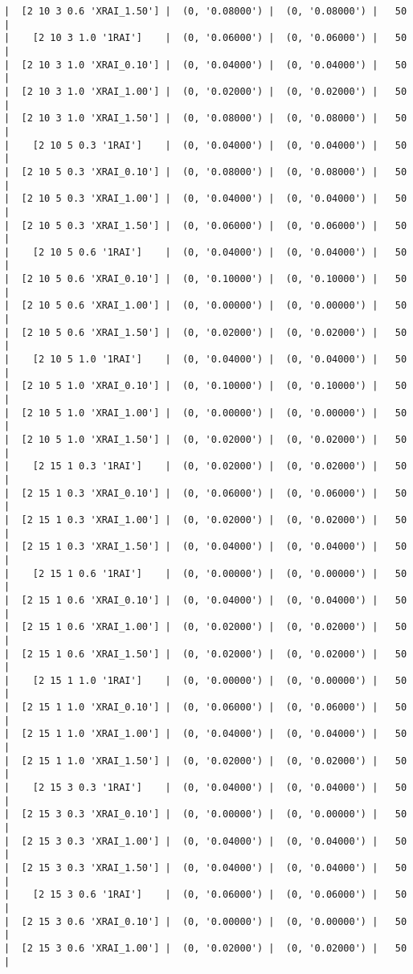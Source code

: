 \documentclass{article}
\begin{document}
\begin{verbatim}
|  [2 10 3 0.6 'XRAI_1.50'] |  (0, '0.08000') |  (0, '0.08000') |   50  |
|    [2 10 3 1.0 '1RAI']    |  (0, '0.06000') |  (0, '0.06000') |   50  |
|  [2 10 3 1.0 'XRAI_0.10'] |  (0, '0.04000') |  (0, '0.04000') |   50  |
|  [2 10 3 1.0 'XRAI_1.00'] |  (0, '0.02000') |  (0, '0.02000') |   50  |
|  [2 10 3 1.0 'XRAI_1.50'] |  (0, '0.08000') |  (0, '0.08000') |   50  |
|    [2 10 5 0.3 '1RAI']    |  (0, '0.04000') |  (0, '0.04000') |   50  |
|  [2 10 5 0.3 'XRAI_0.10'] |  (0, '0.08000') |  (0, '0.08000') |   50  |
|  [2 10 5 0.3 'XRAI_1.00'] |  (0, '0.04000') |  (0, '0.04000') |   50  |
|  [2 10 5 0.3 'XRAI_1.50'] |  (0, '0.06000') |  (0, '0.06000') |   50  |
|    [2 10 5 0.6 '1RAI']    |  (0, '0.04000') |  (0, '0.04000') |   50  |
|  [2 10 5 0.6 'XRAI_0.10'] |  (0, '0.10000') |  (0, '0.10000') |   50  |
|  [2 10 5 0.6 'XRAI_1.00'] |  (0, '0.00000') |  (0, '0.00000') |   50  |
|  [2 10 5 0.6 'XRAI_1.50'] |  (0, '0.02000') |  (0, '0.02000') |   50  |
|    [2 10 5 1.0 '1RAI']    |  (0, '0.04000') |  (0, '0.04000') |   50  |
|  [2 10 5 1.0 'XRAI_0.10'] |  (0, '0.10000') |  (0, '0.10000') |   50  |
|  [2 10 5 1.0 'XRAI_1.00'] |  (0, '0.00000') |  (0, '0.00000') |   50  |
|  [2 10 5 1.0 'XRAI_1.50'] |  (0, '0.02000') |  (0, '0.02000') |   50  |
|    [2 15 1 0.3 '1RAI']    |  (0, '0.02000') |  (0, '0.02000') |   50  |
|  [2 15 1 0.3 'XRAI_0.10'] |  (0, '0.06000') |  (0, '0.06000') |   50  |
|  [2 15 1 0.3 'XRAI_1.00'] |  (0, '0.02000') |  (0, '0.02000') |   50  |
|  [2 15 1 0.3 'XRAI_1.50'] |  (0, '0.04000') |  (0, '0.04000') |   50  |
|    [2 15 1 0.6 '1RAI']    |  (0, '0.00000') |  (0, '0.00000') |   50  |
|  [2 15 1 0.6 'XRAI_0.10'] |  (0, '0.04000') |  (0, '0.04000') |   50  |
|  [2 15 1 0.6 'XRAI_1.00'] |  (0, '0.02000') |  (0, '0.02000') |   50  |
|  [2 15 1 0.6 'XRAI_1.50'] |  (0, '0.02000') |  (0, '0.02000') |   50  |
|    [2 15 1 1.0 '1RAI']    |  (0, '0.00000') |  (0, '0.00000') |   50  |
|  [2 15 1 1.0 'XRAI_0.10'] |  (0, '0.06000') |  (0, '0.06000') |   50  |
|  [2 15 1 1.0 'XRAI_1.00'] |  (0, '0.04000') |  (0, '0.04000') |   50  |
|  [2 15 1 1.0 'XRAI_1.50'] |  (0, '0.02000') |  (0, '0.02000') |   50  |
|    [2 15 3 0.3 '1RAI']    |  (0, '0.04000') |  (0, '0.04000') |   50  |
|  [2 15 3 0.3 'XRAI_0.10'] |  (0, '0.00000') |  (0, '0.00000') |   50  |
|  [2 15 3 0.3 'XRAI_1.00'] |  (0, '0.04000') |  (0, '0.04000') |   50  |
|  [2 15 3 0.3 'XRAI_1.50'] |  (0, '0.04000') |  (0, '0.04000') |   50  |
|    [2 15 3 0.6 '1RAI']    |  (0, '0.06000') |  (0, '0.06000') |   50  |
|  [2 15 3 0.6 'XRAI_0.10'] |  (0, '0.00000') |  (0, '0.00000') |   50  |
|  [2 15 3 0.6 'XRAI_1.00'] |  (0, '0.02000') |  (0, '0.02000') |   50  |

\end{verbatim}
\end{document}
